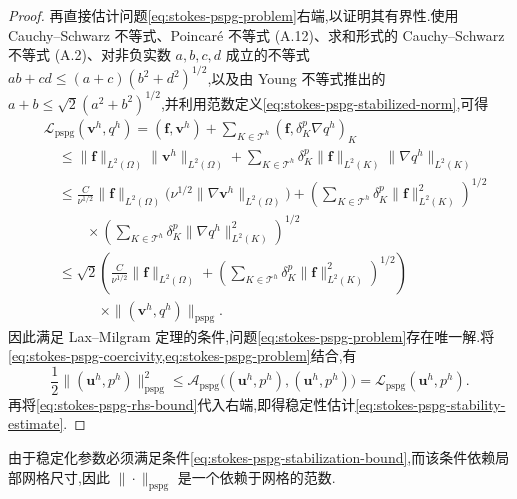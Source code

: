 \begin{proof}
再直接估计问题\cref{eq:stokes-pspg-problem}右端,以证明其有界性.使用 Cauchy--Schwarz 不等式、Poincaré 不等式 (A.12)、求和形式的 Cauchy--Schwarz 不等式 (A.2)、对非负实数 $a,b,c,d$ 成立的不等式
$ab+cd\leq(a+c)(b^2+d^2)^{1/2}$,以及由 Young 不等式推出的
$a+b\leq\sqrt{2}(a^2+b^2)^{1/2}$,并利用范数定义\cref{eq:stokes-pspg-stabilized-norm},可得
\begin{equation}\label{eq:stokes-pspg-rhs-bound}
\begin{aligned}
 &\mathcal{L}_{\mathrm{pspg}}(\bm{v}^h,q^h)
 = (\bm{f},\bm{v}^h)
   +\sum_{K\in\mathcal{T}^h}(\bm{f},\delta_K^p\nabla q^h)_K\\
 &\quad\leq \|\bm{f}\|_{L^2(\Omega)}\|\bm{v}^h\|_{L^2(\Omega)}
   +\sum_{K\in\mathcal{T}^h}\delta_K^p
       \|\bm{f}\|_{L^2(K)}\|\nabla q^h\|_{L^2(K)}\\
 &\quad\leq \frac{C}{\nu^{1/2}}\|\bm{f}\|_{L^2(\Omega)}
       \bigl(\nu^{1/2}\|\nabla\bm{v}^h\|_{L^2(\Omega)}\bigr)
   +\left(\sum_{K\in\mathcal{T}^h}\delta_K^p
       \|\bm{f}\|_{L^2(K)}^2\right)^{1/2}\\
 &\qquad\quad\times\left(\sum_{K\in\mathcal{T}^h}\delta_K^p
       \|\nabla q^h\|_{L^2(K)}^2\right)^{1/2}\\
 &\quad\leq \sqrt{2}\left(\frac{C}{\nu^{1/2}}\|\bm{f}\|_{L^2(\Omega)}
       +\left(\sum_{K\in\mathcal{T}^h}\delta_K^p
       \|\bm{f}\|_{L^2(K)}^2\right)^{1/2}\right)\\
 &\qquad\qquad\times\| (\bm{v}^h,q^h)\|_{\mathrm{pspg}}.
\end{aligned}
\end{equation}
因此满足 Lax--Milgram 定理的条件,问题\cref{eq:stokes-pspg-problem}存在唯一解.将\cref{eq:stokes-pspg-coercivity,eq:stokes-pspg-problem}结合,有
\[
 \frac12\| (\bm{u}^h,p^h)\|_{\mathrm{pspg}}^2
 \leq \mathcal{A}_{\mathrm{pspg}}\bigl((\bm{u}^h,p^h),(\bm{u}^h,p^h)\bigr)
 =\mathcal{L}_{\mathrm{pspg}}(\bm{u}^h,p^h).
\]
再将\cref{eq:stokes-pspg-rhs-bound}代入右端,即得稳定性估计\cref{eq:stokes-pspg-stability-estimate}.
\end{proof}

\begin{note}\label{note:stokes-pspg-mesh-dependent-norm}
由于稳定化参数必须满足条件\cref{eq:stokes-pspg-stabilization-bound},而该条件依赖局部网格尺寸,因此 $\|\cdot\|_{\mathrm{pspg}}$ 是一个依赖于网格的范数.
\end{note}

